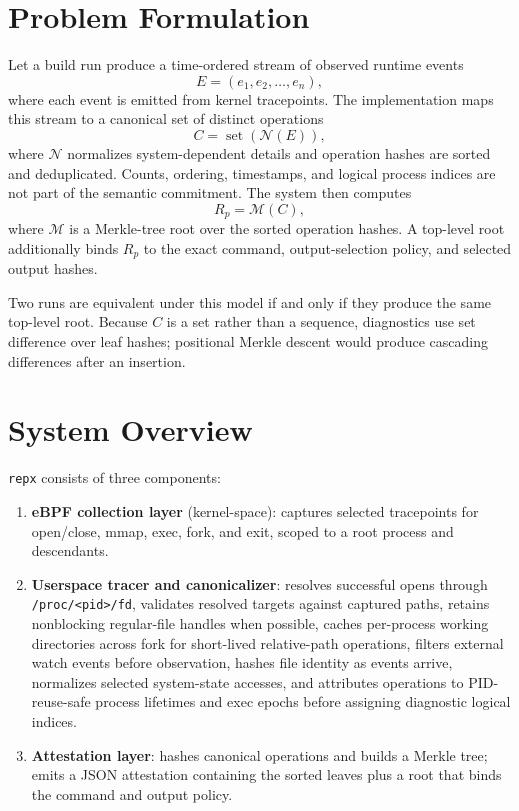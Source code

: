 \documentclass[11pt]{article}
\begin{document}
\section{Problem Formulation}
Let a build run produce a time-ordered stream of observed runtime events
\[
E = (e_1, e_2, \dots, e_n),
\]
where each event is emitted from kernel tracepoints. The implementation maps this stream to a canonical set of distinct operations
\[
C = \operatorname{set}(\mathcal{N}(E)),
\]
where $\mathcal{N}$ normalizes system-dependent details and operation hashes are sorted and deduplicated. Counts, ordering, timestamps, and logical process indices are not part of the semantic commitment. The system then computes
\[
R_p = \mathcal{M}(C),
\]
where $\mathcal{M}$ is a Merkle-tree root over the sorted operation hashes. A top-level root additionally binds $R_p$ to the exact command, output-selection policy, and selected output hashes.

Two runs are equivalent under this model if and only if they produce the same top-level root. Because $C$ is a set rather than a sequence, diagnostics use set difference over leaf hashes; positional Merkle descent would produce cascading differences after an insertion.

\section{System Overview}
\texttt{repx} consists of three components:
\begin{enumerate}
  \item \textbf{eBPF collection layer} (kernel-space): captures selected tracepoints for open/close, mmap, exec, fork, and exit, scoped to a root process and descendants.
  \item \textbf{Userspace tracer and canonicalizer}: resolves successful opens through \texttt{/proc/<pid>/fd}, validates resolved targets against captured paths, retains nonblocking regular-file handles when possible, caches per-process working directories across fork for short-lived relative-path operations, filters external watch events before observation, hashes file identity as events arrive, normalizes selected system-state accesses, and attributes operations to PID-reuse-safe process lifetimes and exec epochs before assigning diagnostic logical indices.
  \item \textbf{Attestation layer}: hashes canonical operations and builds a Merkle tree; emits a JSON attestation containing the sorted leaves plus a root that binds the command and output policy.
\end{enumerate}
\end{document}
